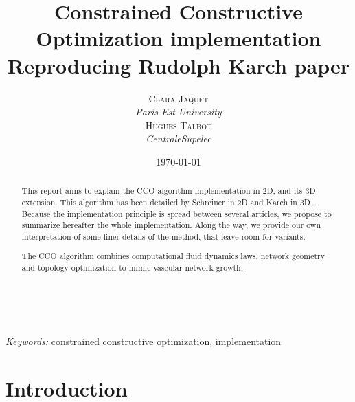 \documentclass[a4paper, 11pt]{article} %
\title{\textbf{Constrained Constructive Optimization implementation}\\ %
Reproducing Rudolph Karch paper} %
\author{\textsc{Clara Jaquet} %
  \\{\textit{Paris-Est University}}
  \\\textsc{Hugues Talbot} %
  \\{\textit{CentraleSupelec}}
} %
\date{\today} %
\makeatletter
\renewcommand{\maketitle}{ %
\begin{flushright} %
{\LARGE\@title} %

\vspace{50pt} %

{\large\@author} %
\\\@date %

\vspace{40pt} %
\end{flushright}
}
\makeatother
\begin{document}
\maketitle %



\begin{abstract}
This report aims to explain the CCO algorithm implementation in 2D, and its 3D extension. This algorithm has been detailed by Schreiner in 2D \cite{schreiner1993computer} and Karch in 3D \cite{karch1999three}. Because the implementation principle is spread between several articles, we propose to summarize hereafter the whole implementation. Along the way, we provide our own interpretation of some finer details of the method, that leave room for variants.
 
The CCO algorithm combines computational fluid dynamics laws, network geometry and topology optimization to mimic vascular network growth.


\end{abstract}

\hspace*{3,6mm}\textit{Keywords:} constrained constructive optimization, implementation %

\vspace{30pt} %

\tableofcontents

\section*{Introduction}
\end{document}
